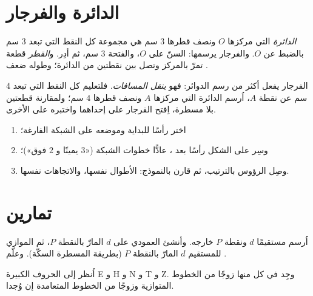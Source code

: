 \section{الدائرة والفرجار}

\begin{definition}[الدائرة]\label{def:g4:geometry:circle}
\emph{الدائرة} التي مركزها $O$ ونصف قطرها $3$ سم هي مجموعة كل
النقط التي تبعد $3$ سم بالضبط عن $O$. والفرجار يرسمها:
السنّ على $O$، والفتحة $3$ سم، ثم أدِر. و\emph{القطر}
قطعة تمرّ بالمركز وتصل بين نقطتين من الدائرة؛ وطوله ضعف
.
\end{definition}

\begin{example}\label{ex:g4:geometry:compass}
الفرجار يفعل أكثر من رسم الدوائر: فهو \emph{ينقل
المسافات}. فلتعليم كل النقط التي تبعد $4$ سم عن نقطة $A$، اُرسم
الدائرة التي مركزها $A$ ونصف قطرها $4$ سم؛ ولمقارنة قطعتين بلا
مسطرة، اِفتح الفرجار على إحداهما واختبره على الأخرى.
\end{example}

\begin{method}\label{met:g4:geometry:reproduce}
\begin{enumerate}
  \item اختر رأسًا للبداية وموضعه على الشبكة الفارغة؛
  \item وسِر على الشكل رأسًا بعد ، عادًّا خطوات
        الشبكة («$3$ يمينًا و $2$ فوق»)؛
  \item وصِل الرؤوس بالترتيب، ثم قارن بالنموذج:
        الأطوال نفسها، والاتجاهات نفسها.
\end{enumerate}
\end{method}

\section{تمارين}

\begin{exercise}[$\star$]\label{exo:g4:geometry:1}
اُرسم مستقيمًا $d$ ونقطة $P$ خارجه. وأنشئ
العمودي على $d$ المارّ بالنقطة $P$، ثم الموازي للمستقيم $d$
المارّ بالنقطة $P$ (بطريقة المسطرة السكّة). وعلّم .
\end{exercise}

\begin{exercise}[$\star$]\label{exo:g4:geometry:2}
اُنظر إلى الحروف الكبيرة E و H و N و T و Z. وجِد في كل
منها زوجًا من الخطوط المتوازية وزوجًا من الخطوط المتعامدة إن
وُجدا.
\end{exercise}

